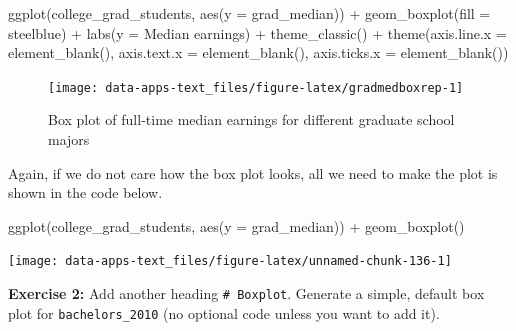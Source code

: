 \documentclass[
]{book}
\makeatletter
\newenvironment{Shaded}{\begin{snugshade}}{\end{snugshade}}
\newcommand{\AttributeTok}[1]{\textcolor[rgb]{0.61,0.61,0.61}{#1}}
\newcommand{\FunctionTok}[1]{\textcolor[rgb]{0,0,0}{#1}}
\newcommand{\NormalTok}[1]{#1}
\newcommand{\SpecialCharTok}[1]{\textcolor[rgb]{0,0,0}{#1}}
\newcommand{\StringTok}[1]{\textcolor[rgb]{0.5,0.5,0.5}{#1}}
\newenvironment{kframe}{%
\medskip{}
\setlength{\fboxsep}{.8em}
 \def\at@end@of@kframe{}%
 \ifinner\ifhmode%
  \def\at@end@of@kframe{\end{minipage}}%
  \begin{minipage}{\columnwidth}%
 \fi\fi%
 \def\FrameCommand##1{\hskip\@totalleftmargin \hskip-\fboxsep
 \colorbox{shadecolor}{##1}\hskip-\fboxsep
     \hskip-\linewidth \hskip-\@totalleftmargin \hskip\columnwidth}%
 \MakeFramed {\advance\hsize-\width
   \@totalleftmargin\z@ \linewidth\hsize
   \@setminipage}}%
 {\par\unskip\endMakeFramed%
 \at@end@of@kframe}
\renewenvironment{Shaded}{\begin{kframe}}{\end{kframe}}
\newenvironment{rmdblock}[1]
  {\begin{shaded*}
  }
  {\end{shaded*}
  }
\newenvironment{learncheck}
  {\begin{rmdblock}{warning}}
  {\end{rmdblock}}
\makeatother
\begin{document}
\begin{Shaded}
\begin{Highlighting}[]
\FunctionTok{ggplot}\NormalTok{(college\_grad\_students, }\FunctionTok{aes}\NormalTok{(}\AttributeTok{y =}\NormalTok{ grad\_median)) }\SpecialCharTok{+}
  \FunctionTok{geom\_boxplot}\NormalTok{(}\AttributeTok{fill =} \StringTok{\textquotesingle{}steelblue\textquotesingle{}}\NormalTok{) }\SpecialCharTok{+}
  \FunctionTok{labs}\NormalTok{(}\AttributeTok{y =} \StringTok{\textquotesingle{}Median earnings\textquotesingle{}}\NormalTok{) }\SpecialCharTok{+}
  \FunctionTok{theme\_classic}\NormalTok{() }\SpecialCharTok{+}
  \FunctionTok{theme}\NormalTok{(}\AttributeTok{axis.line.x =} \FunctionTok{element\_blank}\NormalTok{(),}
        \AttributeTok{axis.text.x =} \FunctionTok{element\_blank}\NormalTok{(),}
        \AttributeTok{axis.ticks.x =} \FunctionTok{element\_blank}\NormalTok{())}
\end{Highlighting}
\end{Shaded}

\begin{figure}

{\centering \texttt{[image: data-apps-text\_files/figure-latex/gradmedboxrep-1]} 

}

\caption{Box plot of full-time median earnings for different graduate school majors}\label{fig:gradmedboxrep}
\end{figure}

Again, if we do not care how the box plot looks, all we need to make the plot is shown in the code below.

\begin{Shaded}
\begin{Highlighting}[]
\FunctionTok{ggplot}\NormalTok{(college\_grad\_students, }\FunctionTok{aes}\NormalTok{(}\AttributeTok{y =}\NormalTok{ grad\_median)) }\SpecialCharTok{+}
  \FunctionTok{geom\_boxplot}\NormalTok{()}
\end{Highlighting}
\end{Shaded}

\begin{center}\texttt{[image: data-apps-text\_files/figure-latex/unnamed-chunk-136-1]} \end{center}

\begin{learncheck}
\textbf{Exercise 2:} Add another heading \texttt{\#\ Boxplot}. Generate
a simple, default box plot for \texttt{bachelors\_2010} (no optional
code unless you want to add it).
\end{learncheck}
\end{document}
